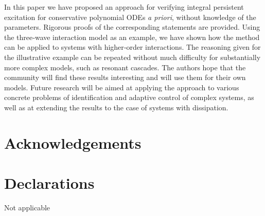 \documentclass[11pt]{article}
\newcommand{\backmatter}{}
\newcommand{\bmhead}[1]{\section*{#1}}
\theoremstyle{thmstyleone}
\theoremstyle{thmstyletwo}
\theoremstyle{thmstylethree}
\begin{document}
In this paper we have proposed an approach for verifying integral persistent excitation for conservative polynomial ODEs \emph{a priori}, without knowledge of the parameters. Rigorous proofs of the corresponding statements are provided.
Using the three‑wave interaction model as an example, we have shown how the method can be applied to systems with higher‑order interactions. The reasoning given for the illustrative example can be repeated without much difficulty for substantially more complex models, such as resonant cascades.
The authors hope that the community will find these results interesting and will use them for their own models. Future research will be aimed at applying the approach to various concrete problems of identification and adaptive control of complex systems, as well as at extending the results to the case of systems with dissipation.


\backmatter



\bmhead{Acknowledgements}



\section*{Declarations}

Not applicable

\end{document}
